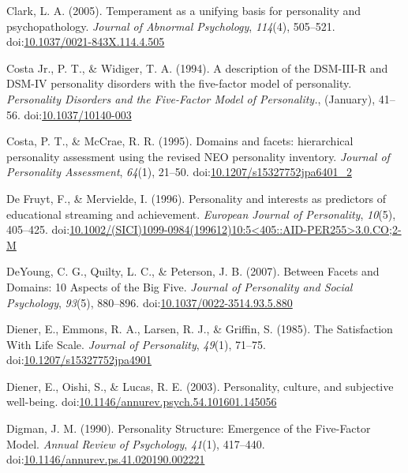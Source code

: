 \documentclass[,man,floatsintext]{apa6}
\begin{document}
\hypertarget{ref-Clark2005}{}
Clark, L. A. (2005). Temperament as a unifying basis for personality and
psychopathology. \emph{Journal of Abnormal Psychology}, \emph{114}(4),
505--521.
doi:\href{https://doi.org/10.1037/0021-843X.114.4.505}{10.1037/0021-843X.114.4.505}

\hypertarget{ref-Widiger1994}{}
Costa Jr., P. T., \& Widiger, T. A. (1994). A description of the
DSM-III-R and DSM-IV personality disorders with the five-factor model of
personality. \emph{Personality Disorders and the Five-Factor Model of
Personality.}, (January), 41--56.
doi:\href{https://doi.org/10.1037/10140-003}{10.1037/10140-003}

\hypertarget{ref-Costa1995}{}
Costa, P. T., \& McCrae, R. R. (1995). Domains and facets: hierarchical
personality assessment using the revised NEO personality inventory.
\emph{Journal of Personality Assessment}, \emph{64}(1), 21--50.
doi:\href{https://doi.org/10.1207/s15327752jpa6401_2}{10.1207/s15327752jpa6401\_2}

\hypertarget{ref-DeFruyt1996}{}
De Fruyt, F., \& Mervielde, I. (1996). Personality and interests as
predictors of educational streaming and achievement. \emph{European
Journal of Personality}, \emph{10}(5), 405--425.
doi:\href{https://doi.org/10.1002/(SICI)1099-0984(199612)10:5\%3C405::AID-PER255\%3E3.0.CO;2-M}{10.1002/(SICI)1099-0984(199612)10:5\textless{}405::AID-PER255\textgreater{}3.0.CO;2-M}

\hypertarget{ref-DeYoung2007}{}
DeYoung, C. G., Quilty, L. C., \& Peterson, J. B. (2007). Between Facets
and Domains: 10 Aspects of the Big Five. \emph{Journal of Personality
and Social Psychology}, \emph{93}(5), 880--896.
doi:\href{https://doi.org/10.1037/0022-3514.93.5.880}{10.1037/0022-3514.93.5.880}

\hypertarget{ref-Diener1985}{}
Diener, E., Emmons, R. A., Larsen, R. J., \& Griffin, S. (1985). The
Satisfaction With Life Scale. \emph{Journal of Personality},
\emph{49}(1), 71--75.
doi:\href{https://doi.org/10.1207/s15327752jpa4901}{10.1207/s15327752jpa4901}

\hypertarget{ref-Diener2003}{}
Diener, E., Oishi, S., \& Lucas, R. E. (2003). Personality, culture, and
subjective well-being.
doi:\href{https://doi.org/10.1146/annurev.psych.54.101601.145056}{10.1146/annurev.psych.54.101601.145056}

\hypertarget{ref-Digman1990}{}
Digman, J. M. (1990). Personality Structure: Emergence of the
Five-Factor Model. \emph{Annual Review of Psychology}, \emph{41}(1),
417--440.
doi:\href{https://doi.org/10.1146/annurev.ps.41.020190.002221}{10.1146/annurev.ps.41.020190.002221}
\end{document}
